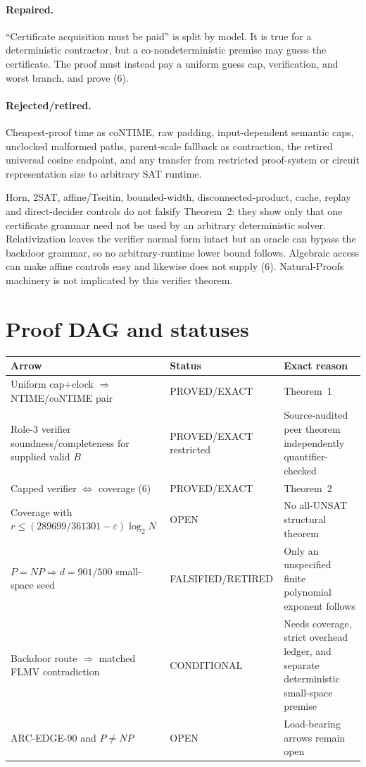 \documentclass[11pt]{article}
\begin{document}
\paragraph{Repaired.}
``Certificate acquisition must be paid'' is split by model.  It is true for
a deterministic contractor, but a co-nondeterministic premise may guess the
certificate.  The proof must instead pay a uniform guess cap, verification,
and worst branch, and prove (6).
\paragraph{Rejected/retired.}
Cheapest-proof time as coNTIME, raw padding, input-dependent semantic caps,
unclocked malformed paths, parent-scale fallback as contraction, the retired
universal cosine endpoint, and any transfer from restricted proof-system or
circuit representation size to arbitrary SAT runtime.

Horn, 2SAT, affine/Tseitin, bounded-width, disconnected-product, cache,
replay and direct-decider controls do not falsify Theorem~2: they show only
that one certificate grammar need not be used by an arbitrary deterministic
solver.  Relativization leaves the verifier normal form intact but an oracle
can bypass the backdoor grammar, so no arbitrary-runtime lower bound follows.
Algebraic access can make affine controls easy and likewise does not supply
(6).  Natural-Proofs machinery is not implicated by this verifier theorem.

\section{Proof DAG and statuses}

\begin{center}
\begin{tabular}{p{.39\linewidth}p{.19\linewidth}p{.34\linewidth}}
\toprule
Arrow & Status & Exact reason \\
\midrule
Uniform cap+clock $\Rightarrow$ NTIME/coNTIME pair & PROVED/EXACT & Theorem~1 \\
Role-3 verifier soundness/completeness for supplied valid $B$ & PROVED/EXACT restricted & Source-audited peer theorem independently quantifier-checked \\
Capped verifier $\Leftrightarrow$ coverage (6) & PROVED/EXACT & Theorem~2 \\
Coverage with $r\le(289699/361301-\varepsilon)\log_2N$ & OPEN & No all-UNSAT structural theorem \\
$P=NP\Rightarrow d=901/500$ small-space seed & FALSIFIED/RETIRED & Only an unspecified finite polynomial exponent follows \\
Backdoor route $\Rightarrow$ matched FLMV contradiction & CONDITIONAL & Needs coverage, strict overhead ledger, and separate deterministic small-space premise \\
ARC-EDGE-90 and $P\ne NP$ & OPEN & Load-bearing arrows remain open \\
\bottomrule
\end{tabular}
\end{center}
\end{document}
